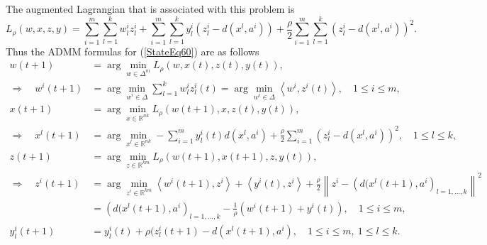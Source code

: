 \documentclass[11pt]{article}
\numberwithin{equation}{section}
\begin{document}
The augmented Lagrangian that is associated with this problem is 
\begin{equation}
	L_{\rho}(w,x,z,y) = \sum\limits_{i=1}^{m} \sum\limits_{l=1}^{k} w^i_l z^i_l + \sum\limits_{i=1}^{m} \sum\limits_{l=1}^{k} y^i_l (z^i_l - d(x^l,a^i)) + \frac{\rho}{2} \sum\limits_{i=1}^{m} \sum\limits_{l=1}^{k} \left(z^i_l - d(x^l,a^i)\right)^2 . \label{StateEq60}
\end{equation}
Thus the ADMM formulas for (\ref{StateEq60}) are as follows
\begin{equation*}
\begin{split}
	w(t+1) &= \arg\min\limits_{w \in \Delta^m} L_{\rho}(w,x(t),z(t),y(t)), \\
	\Rightarrow \quad w^i(t+1) &= \arg\min\limits_{w^i \in \Delta} \sum\limits_{l=1}^{k} w^i_l z^i_l(t) = \arg\min\limits_{w^i \in \Delta} \left\langle w^i, z^i(t) \right\rangle, \quad 1 \leq i \leq m , \\
	x(t+1) &= \arg\min\limits_{x \in \mathbb{R}^{nk}} L_{\rho}(w(t+1),x,z(t),y(t)), \\
	\Rightarrow \quad x^l(t+1) &= \arg\min\limits_{x^l \in \mathbb{R}^{nk}} -\sum\limits_{i=1}^{m} y^i_l(t) d(x^l, a^i) + \frac{\rho}{2} \sum\limits_{i=1}^{m} \left(z^i_l - d(x^l,a^i)\right)^2, \quad 1 \leq l \leq k , \\
	z(t+1) &= \arg\min\limits_{z \in \mathbb{R}^{km}} L_{\rho}(w(t+1),x(t+1),z,y(t)), \\
	\Rightarrow \quad z^i(t+1) &= \arg\min\limits_{z^i \in \mathbb{R}^{km}} \left\langle w^i(t+1), z^i \right\rangle +  \left\langle y^i(t), z^i \right\rangle + \frac{\rho}{2} \left\lVert z^i - \left( d(x^l(t+1), a^i \right)_{l=1, \ldots , k} \right\lVert^2 \\
	&= \left(d(x^l(t+1), a^i \right)_{l=1, \ldots , k} - \frac{1}{\rho}\left( w^i(t+1) + y^i(t) \right), \quad 1 \leq i \leq m, \\
	y^i_l(t+1) &= y^i_l(t) + \rho (z^i_l(t+1) - d(x^l(t+1), a^i), \quad 1 \leq i \leq m, \: 1 \leq l \leq k.
\end{split}
\end{equation*}


\end{document}
